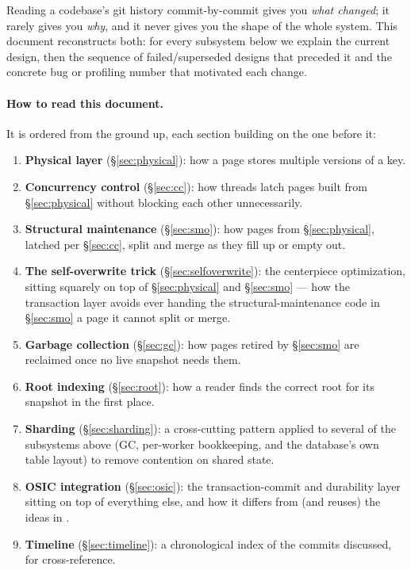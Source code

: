 \documentclass[11pt]{article}
\begin{document}
Reading a codebase's git history commit-by-commit gives you \emph{what changed}; it
rarely gives you \emph{why}, and it never gives you the shape of the whole system. This
document reconstructs both: for every subsystem below we explain the current design,
then the sequence of failed/superseded designs that preceded it and the concrete bug or
profiling number that motivated each change.

\paragraph{How to read this document.} It is ordered from the ground up, each section
building on the one before it:

\begin{enumerate}
  \item \textbf{Physical layer} (\S\ref{sec:physical}): how a page stores multiple
        versions of a key.
  \item \textbf{Concurrency control} (\S\ref{sec:cc}): how threads latch pages built
        from \S\ref{sec:physical} without blocking each other unnecessarily.
  \item \textbf{Structural maintenance} (\S\ref{sec:smo}): how pages from
        \S\ref{sec:physical}, latched per \S\ref{sec:cc}, split and merge as they fill
        up or empty out.
  \item \textbf{The self-overwrite trick} (\S\ref{sec:selfoverwrite}): the centerpiece
        optimization, sitting squarely on top of \S\ref{sec:physical} and
        \S\ref{sec:smo} --- how the transaction layer avoids ever handing the
        structural-maintenance code in \S\ref{sec:smo} a page it cannot split or merge.
  \item \textbf{Garbage collection} (\S\ref{sec:gc}): how pages retired by
        \S\ref{sec:smo} are reclaimed once no live snapshot needs them.
  \item \textbf{Root indexing} (\S\ref{sec:root}): how a reader finds the correct root
        for its snapshot in the first place.
  \item \textbf{Sharding} (\S\ref{sec:sharding}): a cross-cutting pattern applied to
        several of the subsystems above (GC, per-worker bookkeeping, and the database's
        own table layout) to remove contention on shared state.
  \item \textbf{OSIC integration} (\S\ref{sec:osic}): the transaction-commit and
        durability layer sitting on top of everything else, and how it differs from
        (and reuses) the ideas in \cite{alhomssi2023scalable}.
  \item \textbf{Timeline} (\S\ref{sec:timeline}): a chronological index of the commits
        discussed, for cross-reference.
\end{enumerate}
\end{document}
